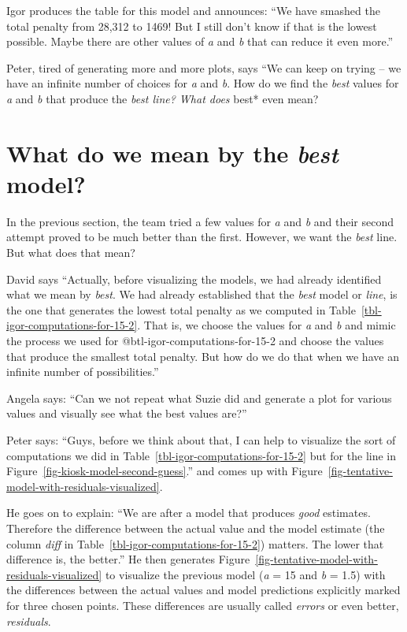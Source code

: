 \documentclass[
  12pt,
  letterpaper,
  DIV=11,
  numbers=noendperiod]{scrreprt}
\begin{document}
Igor produces the table for this model and announces: ``We have smashed
the total penalty from 28,312 to 1469! But I still don't know if that is
the lowest possible. Maybe there are other values of \emph{a} and
\emph{b} that can reduce it even more.''

Peter, tired of generating more and more plots, says ``We can keep on
trying -- we have an infinite number of choices for \emph{a} and
\emph{b}. How do we find the \emph{best} values for \emph{a} and
\emph{b} that produce the \emph{best line? What does }best* even mean?

\section{\texorpdfstring{What do we mean by the \emph{best}
model?}{What do we mean by the best model?}}\label{what-do-we-mean-by-the-best-model}

In the previous section, the team tried a few values for \emph{a} and
\emph{b} and their second attempt proved to be much better than the
first. However, we want the \emph{best} line. But what does that mean?

David says ``Actually, before visualizing the models, we had already
identified what we mean by \emph{best}. We had already established that
the \emph{best} model or \emph{line}, is the one that generates the
lowest total penalty as we computed in
Table~\ref{tbl-igor-computations-for-15-2}. That is, we choose the
values for \emph{a} and \emph{b} and mimic the process we used for
@btl-igor-computations-for-15-2 and choose the values that produce the
smallest total penalty. But how do we do that when we have an infinite
number of possibilities.''

Angela says: ``Can we not repeat what Suzie did and generate a plot for
various values and visually see what the best values are?''

Peter says: ``Guys, before we think about that, I can help to visualize
the sort of computations we did in
Table~\ref{tbl-igor-computations-for-15-2} but for the line in
Figure~\ref{fig-kiosk-model-second-guess}.'' and comes up with
Figure~\ref{fig-tentative-model-with-residuals-visualized}.

He goes on to explain: ``We are after a model that produces \emph{good}
estimates. Therefore the difference between the actual value and the
model estimate (the column \emph{diff} in
Table~\ref{tbl-igor-computations-for-15-2}) matters. The lower that
difference is, the better.'' He then generates
Figure~\ref{fig-tentative-model-with-residuals-visualized} to visualize
the previous model (\emph{a} = 15 and \emph{b} = 1.5) with the
differences between the actual values and model predictions explicitly
marked for three chosen points. These differences are usually called
\emph{errors} or even better, \emph{residuals}.
\end{document}
